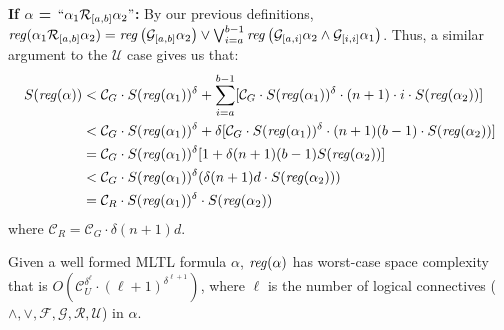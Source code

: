 \documentclass[runningheads]{llncs}
\begin{document}
  \textbf{If $\alpha$ = $``\alpha_1 \mathcal{R}_{[a, b]} \alpha_2"$:}
        By our previous definitions, $\text{\emph{reg}}(\alpha_1 \mathcal{R}_{[a,b]} \alpha_2) =  \text{\emph{reg}}\left(\mathcal{G}_{[a,b]}\alpha_2\right) \lor \bigvee_{i=a}^{b-1} \text{\emph{reg}}\left(\mathcal{G}_{[a,i]}\alpha_2 \land \mathcal{G}_{[i, i]} \alpha_1\right)$. Thus, a similar argument to the $\mathcal{U}$ case gives us that: 
        \begin{align*}
            S(\text{\emph{reg}}(\alpha)) &< 
            \mathcal{C}_G \cdot S(\text{\emph{reg}}(\alpha_1))^
            \delta + \sum_{i = a}^{b-1} [\mathcal{C}_G \cdot S(\text{\emph{reg}}(\alpha_1))^
            \delta \cdot (n+1)\cdot i \cdot S(\text{\emph{reg}}(\alpha_2))] \\
            &< \mathcal{C}_G \cdot S(\text{\emph{reg}}(\alpha_1))^
            \delta + \delta[\mathcal{C}_G \cdot S(\text{\emph{reg}}(\alpha_1))^
            \delta \cdot (n+1)(b-1) \cdot S(\text{\emph{reg}}(\alpha_2))] \\
            &= \mathcal{C}_G \cdot S(\text{\emph{reg}}(\alpha_1))^
            \delta [1 + \delta(n+1)(b-1)S(\text{\emph{reg}}(\alpha_2))] \\
            &< \mathcal{C}_G \cdot S(\text{\emph{reg}}(\alpha_1))^
            \delta (\delta(n+1)d \cdot S(\text{\emph{reg}}(\alpha_2))) \\
            &= \mathcal{C}_R \cdot S(\text{\emph{reg}}(\alpha_1))^\delta \cdot S(\text{\emph{reg}}(\alpha_2))
        \end{align*}
        where $\mathcal{C}_R = \mathcal{C}_G \cdot \delta (n+1)d$. \\
\begin{theorem}
Given a well formed MLTL formula $\alpha$, $\text{\emph{reg}}(\alpha)$ has worst-case space complexity that is $O(\mathcal{C}_U^{\delta ^ \ell} \cdot (\ell + 1)^{\delta^{\ell + 1}})$, where $\ell$ is the number of logical connectives ($\land, \lor, \mathcal{F}, \mathcal{G}, \mathcal{R}, \mathcal{U}$) in $\alpha$. 
\end{theorem}
\end{document}
